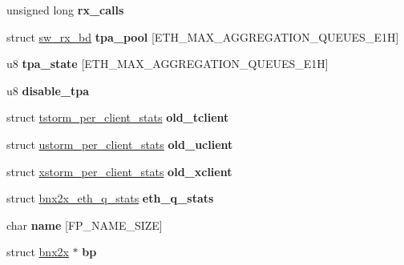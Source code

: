 \begin{DoxyCompactItemize}
\item 
\hypertarget{structbnx2x__fastpath_a78ea9152aa3a9909986e736d0f61c285}{
unsigned long {\bfseries rx\_\-calls}}
\label{structbnx2x__fastpath_a78ea9152aa3a9909986e736d0f61c285}

\item 
\hypertarget{structbnx2x__fastpath_aaf2ce26ea072a41ef4f43336b1ac0493}{
struct \hyperlink{structsw__rx__bd}{sw\_\-rx\_\-bd} {\bfseries tpa\_\-pool} \mbox{[}ETH\_\-MAX\_\-AGGREGATION\_\-QUEUES\_\-E1H\mbox{]}}
\label{structbnx2x__fastpath_aaf2ce26ea072a41ef4f43336b1ac0493}

\item 
\hypertarget{structbnx2x__fastpath_a4be05b3a5ffd19c73a5bc7120c599fe4}{
u8 {\bfseries tpa\_\-state} \mbox{[}ETH\_\-MAX\_\-AGGREGATION\_\-QUEUES\_\-E1H\mbox{]}}
\label{structbnx2x__fastpath_a4be05b3a5ffd19c73a5bc7120c599fe4}

\item 
\hypertarget{structbnx2x__fastpath_aaefb76c9a367434d5195ed42b590aa2a}{
u8 {\bfseries disable\_\-tpa}}
\label{structbnx2x__fastpath_aaefb76c9a367434d5195ed42b590aa2a}

\item 
\hypertarget{structbnx2x__fastpath_adb8b7dc4310657576d24cfaf37018fb6}{
struct \hyperlink{structtstorm__per__client__stats}{tstorm\_\-per\_\-client\_\-stats} {\bfseries old\_\-tclient}}
\label{structbnx2x__fastpath_adb8b7dc4310657576d24cfaf37018fb6}

\item 
\hypertarget{structbnx2x__fastpath_a76571a045f0719ef45c0e4837fb2e8aa}{
struct \hyperlink{structustorm__per__client__stats}{ustorm\_\-per\_\-client\_\-stats} {\bfseries old\_\-uclient}}
\label{structbnx2x__fastpath_a76571a045f0719ef45c0e4837fb2e8aa}

\item 
\hypertarget{structbnx2x__fastpath_a364c878034e117e16cf4a7ba6ba44383}{
struct \hyperlink{structxstorm__per__client__stats}{xstorm\_\-per\_\-client\_\-stats} {\bfseries old\_\-xclient}}
\label{structbnx2x__fastpath_a364c878034e117e16cf4a7ba6ba44383}

\item 
\hypertarget{structbnx2x__fastpath_a7fdf84a8dc84212af848ab07014d003c}{
struct \hyperlink{structbnx2x__eth__q__stats}{bnx2x\_\-eth\_\-q\_\-stats} {\bfseries eth\_\-q\_\-stats}}
\label{structbnx2x__fastpath_a7fdf84a8dc84212af848ab07014d003c}

\item 
\hypertarget{structbnx2x__fastpath_a539ea84817d0d3265c5f37e959c6f077}{
char {\bfseries name} \mbox{[}FP\_\-NAME\_\-SIZE\mbox{]}}
\label{structbnx2x__fastpath_a539ea84817d0d3265c5f37e959c6f077}

\item 
\hypertarget{structbnx2x__fastpath_a66f98d370e349f4e94a8e0564e2c1c58}{
struct \hyperlink{structbnx2x}{bnx2x} $\ast$ {\bfseries bp}}
\label{structbnx2x__fastpath_a66f98d370e349f4e94a8e0564e2c1c58}

\end{DoxyCompactItemize}


